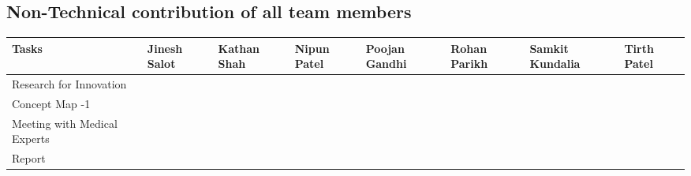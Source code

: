 \documentclass{article}
\begin{document}
\subsection{Non-Technical contribution of all team members }
\begin{table}[h]
		\begin{tabular}{|p{3.8154cm}|p{1.4154cm}|p{1.4154cm}|p{1.4154cm}|p{1.4154cm}|p{1.4154cm}|p{1.4154cm}|p{1.4154cm}|}
			\hline
			Tasks  & Jinesh Salot & Kathan Shah & Nipun Patel & Poojan Gandhi & Rohan Parikh & Samkit Kundalia & Tirth Patel \\ \hline
			Research for Innovation &  {\Large \checkmark}    & {\Large \checkmark}      &{\Large \checkmark}        &  {\Large \checkmark}        & {\Large \checkmark}    &   {\Large \checkmark}    &  {\Large \checkmark}       \\ \hline
			Concept Map -1 &   {\Large \checkmark}   &  {\Large \checkmark}     &        &   {\Large \checkmark}       &     &      &  {\Large \checkmark}       \\ \hline
			Meeting with Medical Experts &      &  {\Large \checkmark}     &    {\Large \checkmark}    &          &   {\Large \checkmark}  &   {\Large \checkmark}    &       \\ \hline
			Report & {\Large \checkmark}     &       &   {\Large \checkmark}     &          & {\Large \checkmark}    &  {\Large \checkmark}     & {\Large \checkmark}      \\ \hline
		\end{tabular}
\end{table}
\end{document}
